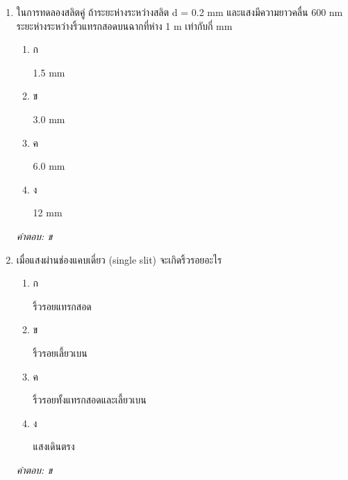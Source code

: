 \documentclass[12pt]{article}
\begin{document}
\begin{enumerate}[label=\arabic*., itemsep=0.5\baselineskip, topsep=0.5\baselineskip, leftmargin=*]
\item ในการทดลองสลิตคู่ ถ้าระยะห่างระหว่างสลิต d = 0.2 mm และแสงมีความยาวคลื่น 600 nm ระยะห่างระหว่างริ้วแทรกสอดบนฉากที่ห่าง 1 m เท่ากับกี่ mm
\begin{enumerate}[label=\alph*)., itemsep=0.3\baselineskip, topsep=0.3\baselineskip]
\item ก\ 
\begin{minipage}[t]{0.9\linewidth}
\raggedright 1.5 mm
\end{minipage}
\item ข\ 
\begin{minipage}[t]{0.9\linewidth}
\raggedright 3.0 mm
\end{minipage}
\item ค\ 
\begin{minipage}[t]{0.9\linewidth}
\raggedright 6.0 mm
\end{minipage}
\item ง\ 
\begin{minipage}[t]{0.9\linewidth}
\raggedright 12 mm
\end{minipage}
\end{enumerate}
\vspace{-0.3\baselineskip}
\begin{small}
\textit{คำตอบ: ข}
\end{small}

\item เมื่อแสงผ่านช่องแคบเดี่ยว (single slit) จะเกิดริ้วรอยอะไร
\begin{enumerate}[label=\alph*)., itemsep=0.3\baselineskip, topsep=0.3\baselineskip]
\item ก\ 
\begin{minipage}[t]{0.9\linewidth}
\raggedright ริ้วรอยแทรกสอด
\end{minipage}
\item ข\ 
\begin{minipage}[t]{0.9\linewidth}
\raggedright ริ้วรอยเลี้ยวเบน
\end{minipage}
\item ค\ 
\begin{minipage}[t]{0.9\linewidth}
\raggedright ริ้วรอยทั้งแทรกสอดและเลี้ยวเบน
\end{minipage}
\item ง\ 
\begin{minipage}[t]{0.9\linewidth}
\raggedright แสงเดินตรง
\end{minipage}
\end{enumerate}
\vspace{-0.3\baselineskip}
\begin{small}
\textit{คำตอบ: ข}
\end{small}


\end{enumerate}
\end{document}
